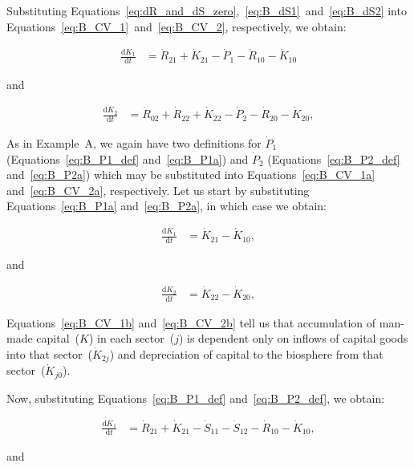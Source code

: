 Substituting Equations~\ref{eq:dR_and_dS_zero},~\ref{eq:B_dS1}~and~\ref{eq:B_dS2}
into Equations~\ref{eq:B_CV_1}~and~\ref{eq:B_CV_2},
respectively,
we obtain:

\begin{align} 
\label{eq:B_CV_1a}
	 \frac{\mathrm{d}K_{1}}{\mathrm{d}t}	&
	=  \dot{R}_{21}
	+ \dot{K}_{21}
	- \dot{P}_{1} 
	- \dot{R}_{10} 
	- \dot{K}_{10}
\end{align}

\noindent{}and

\begin{align}
\label{eq:B_CV_2a}
	\frac{\mathrm{d}K_{2}}{\mathrm{d}t}	&
	=  \dot{R}_{02} 
	+ \dot{R}_{22} 
	+ \dot{K}_{22}
	- \dot{P}_{2}
	- \dot{R}_{20} 
	- \dot{K}_{20},
\end{align}


As in Example~A,
we again have two definitions for $\dot{P}_{1}$
(Equations~\ref{eq:B_P1_def} and~\ref{eq:B_P1a})
and $\dot{P}_{2}$ 
(Equations~\ref{eq:B_P2_def} and~\ref{eq:B_P2a})
which may be substituted into
Equations~\ref{eq:B_CV_1a} and~\ref{eq:B_CV_2a},
respectively. 
Let us start by substituting Equations~\ref{eq:B_P1a} and~\ref{eq:B_P2a},
in which case we obtain:

\begin{align} 
\label{eq:B_CV_1b}
	 \frac{\mathrm{d}K_{1}}{\mathrm{d}t}	&
	= \dot{K}_{21}
	- \dot{K}_{10},
\end{align}

\noindent{}and

\begin{align}
\label{eq:B_CV_2b}
	\frac{\mathrm{d}K_{2}}{\mathrm{d}t}	&
	=  \dot{K}_{22}
	- \dot{K}_{20},
\end{align}

\noindent{}Equations~\ref{eq:B_CV_1b} and~\ref{eq:B_CV_2b} 
tell us that accumulation 
of man-made capital~($K$) in each sector~($j$)
is dependent only on inflows of capital goods 
into that sector~($\dot{K}_{2j}$) and 
depreciation of capital to the biosphere 
from that sector~($\dot{K}_{j0}$).

Now, substituting
Equations~\ref{eq:B_P1_def} and~\ref{eq:B_P2_def},
we obtain:

\begin{align} 
\label{eq:B_CV_1c}
	 \frac{\mathrm{d}K_{1}}{\mathrm{d}t}	&
	=  \dot{R}_{21}
	+ \dot{K}_{21}
	- \dot{S}_{11}
	- \dot{S}_{12} 
	- \dot{R}_{10} 
	- \dot{K}_{10},
\end{align}

\noindent{}and

